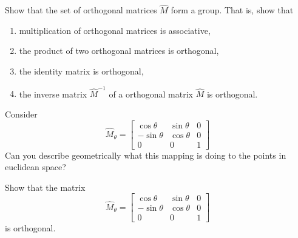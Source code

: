 \documentclass{ximera}
\begin{document}
\begin{problem}
\begin{image}
\end{image}

\end{problem}






\begin{problem}
Show that the set of orthogonal matrices $\hat{M}$ form a group.  That
is, show that
\begin{enumerate}
\item multiplication of orthogonal matrices is associative, 
\item the product of two orthogonal matrices is orthogonal,
\item the identity matrix is orthogonal,
\item the inverse matrix $\hat{M}^{-1}$ of a orthogonal matrix $\hat{M}$ is orthogonal.
\end{enumerate}
\end{problem}




\begin{problem}
  Consider
  \[
  \hat{M}_\theta=\begin{bmatrix}
  \cos\theta & \sin\theta & 0\\
  -\sin\theta & \cos\theta & 0\\
  0 & 0 & 1
  \end{bmatrix}
  \]
  Can you describe geometrically what this mapping is doing
  to the points in euclidean space?
\end{problem}


\begin{problem}
\label{14} Show that the matrix%
\[
\hat{M}_\theta=\begin{bmatrix}
\cos\theta & \sin\theta & 0\\
-\sin\theta & \cos\theta & 0\\
0 & 0 & 1
\end{bmatrix}
\]
is orthogonal. 
\end{problem}
\end{document}
